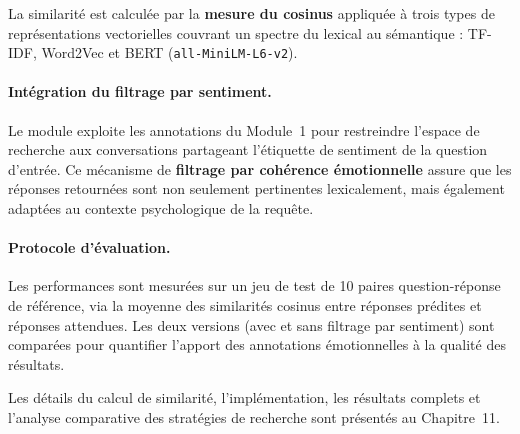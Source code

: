 \documentclass[12pt,a4paper]{report}
\begin{document}
La similarité est calculée par la \textbf{mesure du cosinus} appliquée à trois types de représentations vectorielles couvrant un spectre du lexical au sémantique : TF-IDF, Word2Vec et BERT (\texttt{all-MiniLM-L6-v2}).

\paragraph{Intégration du filtrage par sentiment.} Le module exploite les annotations du Module~1 pour restreindre l'espace de recherche aux conversations partageant l'étiquette de sentiment de la question d'entrée. Ce mécanisme de \textbf{filtrage par cohérence émotionnelle} assure que les réponses retournées sont non seulement pertinentes lexicalement, mais également adaptées au contexte psychologique de la requête.

\paragraph{Protocole d'évaluation.} Les performances sont mesurées sur un jeu de test de 10 paires question-réponse de référence, via la moyenne des similarités cosinus entre réponses prédites et réponses attendues. Les deux versions (avec et sans filtrage par sentiment) sont comparées pour quantifier l'apport des annotations émotionnelles à la qualité des résultats.

\medskip
\begin{note}[Remarque]
Les détails du calcul de similarité, l'implémentation, les résultats complets et l'analyse comparative des stratégies de recherche sont présentés au Chapitre~11.
\end{note}
\end{document}

